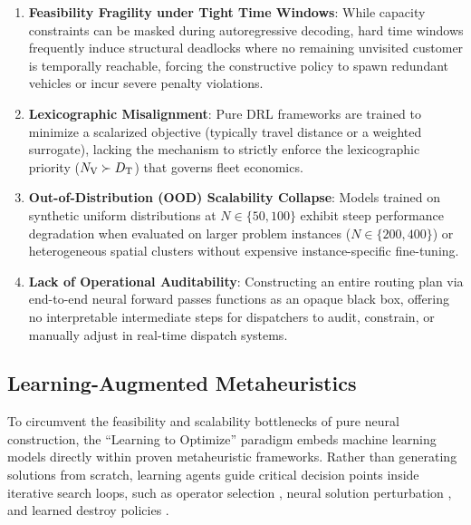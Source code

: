\begin{enumerate}
    \item \textbf{Feasibility Fragility under Tight Time Windows}: While capacity
    constraints can be masked during autoregressive decoding, hard time windows
    frequently induce structural deadlocks where no remaining unvisited customer
    is temporally reachable, forcing the constructive policy to spawn redundant
    vehicles or incur severe penalty violations.
    \item \textbf{Lexicographic Misalignment}: Pure DRL frameworks are trained
    to minimize a scalarized objective (typically travel distance or a
    weighted surrogate), lacking the mechanism to strictly enforce the
    lexicographic priority (${N_\mathrm{V}} \succ {D_\mathrm{T}}$) that governs fleet economics.
    \item \textbf{Out-of-Distribution (OOD) Scalability Collapse}: Models trained
    on synthetic uniform distributions at $N \in \{50, 100\}$ exhibit steep
    performance degradation when evaluated on larger problem instances
    ($N \in \{200, 400\}$) or heterogeneous spatial clusters without expensive
    instance-specific fine-tuning.
    \item \textbf{Lack of Operational Auditability}: Constructing an entire routing
    plan via end-to-end neural forward passes functions as an opaque black box,
    offering no interpretable intermediate steps for dispatchers to audit,
    constrain, or manually adjust in real-time dispatch systems.
\end{enumerate}

\subsection{Learning-Augmented Metaheuristics}
\label{sec:rw_hybrid}

To circumvent the feasibility and scalability bottlenecks of pure neural construction, the ``Learning to Optimize'' paradigm \cite{bengio2021machine} embeds machine learning models directly within proven metaheuristic frameworks. Rather than generating solutions from scratch, learning agents guide critical decision points inside iterative search loops, such as operator selection \cite{syberfeldt2009reinforcement, lu2020learning}, neural solution perturbation \cite{chen2019learning}, and learned destroy policies \cite{hottung2020neural, son2023learning}.

